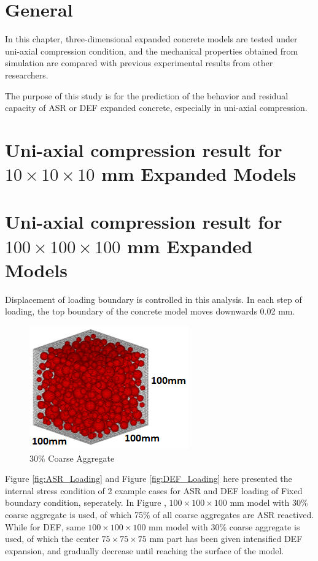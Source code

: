 

\section{General}

In this chapter, three-dimensional expanded concrete models are tested under uni-axial compression condition, and the mechanical properties obtained from simulation are compared with previous experimental results from other researchers.

The purpose of this study is for the prediction of the behavior and residual capacity of ASR or DEF expanded concrete, especially in uni-axial compression.


\clearpage
\section{Uni-axial compression result for $10 \times 10 \times 10$ mm Expanded Models}


\clearpage


\clearpage

\section{Uni-axial compression result for $100 \times 100 \times 100$ mm Expanded Models}

Displacement of loading boundary is controlled in this analysis. In each step of loading, the top boundary of the concrete model moves downwards 0.02 mm.

\begin{figure}[ht!]
\centering
\includegraphics[width=.3\linewidth]{Files/Aggregate/A30.png}
  \caption{30\% Coarse Aggregate}
  \label{fig:A30_model}
\end{figure}

Figure \ref{fig:ASR_Loading} and Figure \ref{fig:DEF_Loading} here presented the internal stress condition of 2 example cases for ASR and DEF loading of Fixed boundary condition, seperately. In Figure , $100 \times 100 \times 100$ mm model with 30\% coarse aggregate is used, of which 75\% of all coarse aggregates are ASR reactived. While for DEF, same $100 \times 100 \times 100$ mm model with 30\% coarse aggregate is used, of which the center $75 \times 75 \times 75$ mm part has been given intensified DEF expansion, and gradually decrease until reaching the surface of the model.

